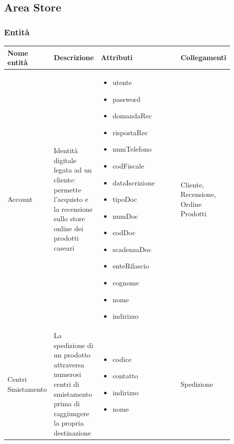 \documentclass[12pt,a4paper]{article}
\begin{document}
\subsection{Area Store}
\subsubsection{Entità}
\label{Store Entita}
\begin{center}
\setlength{\extrarowheight}{1.5pt}
\begin{longtable}{|p{0.14\linewidth}|p{0.20\linewidth}|p{0.36\linewidth}|p{0.20\linewidth}|}
\hline 
\textbf{Nome entità} 	& \textbf{Descrizione} & \textbf{Attributi} & \textbf{Collegamenti}\\ 

\hline

    
\hline

Account 				&  Identità digitale legata ad un cliente: permette l'acquisto e la recensione sullo store online dei prodotti caseari  
					& \begin{itemize}
						\setlength{\itemindent}{-1em}
						\vspace{-15pt}
						\setlength\itemsep{-0.25em}
						\item utente
						\item password
						\item domandaRec
						\item rispostaRec
						\item numTelefono
						\item codFiscale
						\item dataIscrizione
						\item tipoDoc
						\item numDoc
						\item codDoc
						\item scadenzaDoc
						\item enteRilascio
						\item cognome
						\item nome
						\item indirizzo
						
					\end{itemize}
					&  Cliente, Recensione, Ordine Prodotti  \\ 

\hline
Centri Smistamento 	&  La spedizione di un prodotto attraversa numerosi centri di smistamento prima di raggiungere la propria destinazione  
					& \begin{itemize}
						\setlength{\itemindent}{-1em}
						\vspace{-25pt}
						\setlength\itemsep{-0.25em}
						\item codice
						\item contatto
						\item indirizzo
						\item nome
					\end{itemize}
					&  Spedizione  \\ 


\end{longtable}
\end{center}
\end{document}
